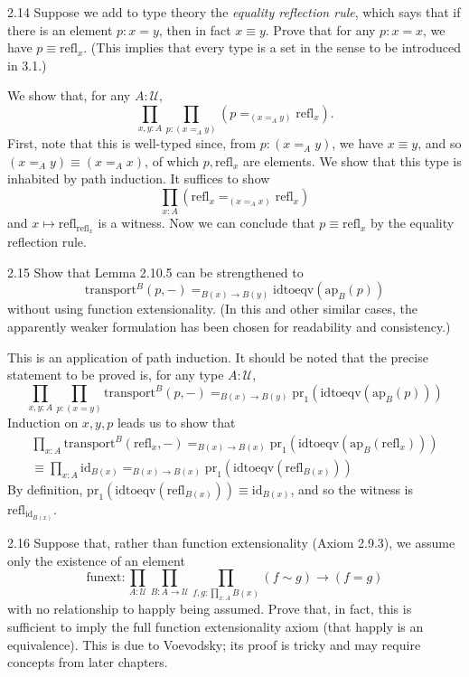 \documentclass[14pt]{extarticle}
\newcommand{\0}{{\mathbf 0}}
\newcommand{\1}{{\mathbf 1}}
\newcommand{\2}{{\mathbf 2}}
\newcommand{\UU}{{\mathcal U}}
\newcommand{\mt}{\mapsto}
\newcommand{\refl}{\mathrm{refl}}
\newcommand{\pr}{\mathrm{pr}}
\newcommand{\id}{\mathrm{id}}
\newcommand{\tr}{\mathrm{transport}}
\newcommand{\ap}{\mathrm{ap}}
\newcommand{\idtoeqv}{\mathrm{idtoeqv}}
\begin{document}
\begin{prob}{2.14}{}
Suppose we add to type theory the \textit{equality reflection rule}, which says that if there is an element $p : x=y$, then in fact $x \equiv y$. Prove that for any $p : x=x$, we have $p \equiv \refl_x$. (This implies that every type is a set in the sense to be introduced in 3.1.)
\end{prob}
We show that, for any $A : \UU$,
\[\prod_{x,y : A}\prod_{p :(x =_A y)} (p =_{(x =_A y)} \refl_{x}).\] First, note that this is well-typed since, from $p : (x =_A y)$, we have $x \equiv y$, and so $(x =_A y) \equiv (x =_A x)$, of which $p,\refl_x$ are elements. We show that this type is inhabited by path induction. It suffices to show
\[\prod_{x: A} (\refl_x =_{(x =_A x)} \refl_{x})\] and $x \mt \refl_{\refl_x}$ is a witness. Now we can conclude that $p \equiv \refl_x$ by the equality reflection rule.

\begin{prob}{2.15}{}
Show that Lemma 2.10.5 can be strengthened to \[\tr^B(p,-) =_{B(x) \to B(y)}\idtoeqv(\ap_B(p))\] without using function extensionality. (In this and other similar cases, the apparently weaker formulation has been chosen for readability and consistency.)
\end{prob}
This is an application of path induction. It should be noted that the precise statement to be proved is, for any type $A : \UU$,
\[\prod_{x,y : A}\prod_{p : (x=y)}\tr^B(p,-) =_{B(x) \to B(y)}\pr_1(\idtoeqv(\ap_B(p)))\]
Induction on $x,y,p$ leads us to show that
\begin{multline*}
\prod_{x : A}\tr^B(\refl_{x},-) =_{B(x) \to B(x)}\pr_1(\idtoeqv(\ap_B(\refl_x))) \\
\equiv \prod_{x : A}\id_{B(x)} =_{B(x) \to B(x)}\pr_1(\idtoeqv(\refl_{B(x)}))\end{multline*}
By definition, $\pr_1(\idtoeqv(\refl_{B(x)})) \equiv \id_{B(x)}$, and so the witness is $\refl_{\id_{B(x)}}$.

\begin{prob}{2.16}{}
Suppose that, rather than function extensionality (Axiom 2.9.3), we assume only the existence of an element
\[\text{funext} : \prod_{A : \UU}\prod_{B : A \to \UU} \prod_{f,g : \prod_{x : A}B(x)} (f \sim g) \to (f = g)\] with no relationship to happly being assumed. Prove that, in fact, this is sufficient to imply the full function extensionality axiom (that happly is an equivalence). This is due to Voevodsky; its proof is tricky and may require concepts from later chapters.
\end{prob}
\end{document}

